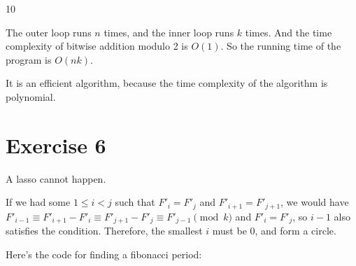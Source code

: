 \documentclass[
]{article}
\newenvironment{Shaded}{\begin{snugshade}}{\end{snugshade}}
\newcommand{\BuiltInTok}[1]{#1}
\newcommand{\ControlFlowTok}[1]{\textcolor[rgb]{0.13,0.29,0.53}{\textbf{#1}}}
\newcommand{\DecValTok}[1]{\textcolor[rgb]{0.00,0.00,0.81}{#1}}
\newcommand{\KeywordTok}[1]{\textcolor[rgb]{0.13,0.29,0.53}{\textbf{#1}}}
\newcommand{\NormalTok}[1]{#1}
\newcommand{\OperatorTok}[1]{\textcolor[rgb]{0.81,0.36,0.00}{\textbf{#1}}}
\newcommand{\SpecialCharTok}[1]{\textcolor[rgb]{0.00,0.00,0.00}{#1}}
\newcommand{\SpecialStringTok}[1]{\textcolor[rgb]{0.31,0.60,0.02}{#1}}
\newcommand{\VariableTok}[1]{\textcolor[rgb]{0.00,0.00,0.00}{#1}}
\begin{document}
\begin{Shaded}
\begin{Highlighting}[]
\NormalTok{10}
\end{Highlighting}
\end{Shaded}

The outer loop runs \(n\) times, and the inner loop runs \(k\) times.
And the time complexity of bitwise addition modulo 2 is \(O(1)\). So the
running time of the program is \(O(nk)\).

It is an efficient algorithm, because the time complexity of the
algorithm is polynomial.

\hypertarget{exercise-6}{%
\section{Exercise 6}\label{exercise-6}}

A lasso cannot happen.

If we had some \(1\le i<j\) such that \(F'_i=F'_j\) and
\(F'_{i+1}=F'_{j+1}\), we would have
\(F'_{i-1}\equiv F'_{i+1}-F'_i\equiv F'_{j+1}-F'_j\equiv F'_{j-1}\pmod k\)
and \(F'_i=F'_j\), so \(i-1\) also satisfies the condition. Therefore,
the smallest \(i\) must be \(0\), and form a circle.

Here's the code for finding a fibonacci period:

\begin{Shaded}
\end{Shaded}
\end{document}
